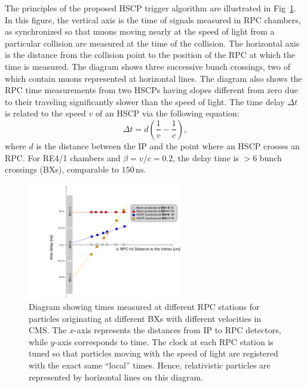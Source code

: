 The principles of the proposed HSCP trigger algorithm are illustrated in Fig~\ref{fig:HSCP_diagram}. In this figure, the vertical axis is the time of signals measured in RPC chambers, as synchronized so that muons moving nearly at the speed of light from a particular collision are measured at the time of the collision. The horizontal axis is the distance from the collision point to the position of the RPC at which the time is measured. The diagram shows three successive bunch crossings, two of which contain muons represented at horizontal lines. The diagram also shows the RPC time measurements from two HSCPs having slopes different from zero due to their traveling significantly slower than the speed of light. 
The time delay $\Delta t$ is related to the speed $v$ of an HSCP via the following equation:
%
\begin{equation}
\label{eq:HSCP_delay}
\Delta t = d\left(\frac{1}{v}-\frac{1}{c}\right),
\end{equation}
%
where $d$ is the distance between the IP and the point where an HSCP crosses an RPC. 
For RE4/1 chambers and $\beta = v/c = 0.2$, the delay time is $>6$ bunch crossings (BXs), comparable to $150 \, \mathrm{ns}$.

\begin{figure}[t]
  \centering
  \includegraphics[width=0.6\textwidth]{figures/HSCP/diagram.pdf}
  \caption{
Diagram showing times measured at different RPC stations for particles originating at different BXs with different velocities in CMS. The $x$-axis represents the distances from IP to RPC detectors, while $y$-axis corresponds to time.
The clock at each RPC station is tuned so that particles moving with the speed of light are registered with the exact same ``local'' times. Hence, relativistic particles are represented by horizontal lines on this diagram. 
  }
  \label{fig:HSCP_diagram}
\end{figure}


